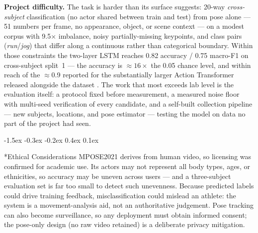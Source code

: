 \documentclass[final]{article}
\makeatletter
\renewcommand{\section}{%
  \@startsection{section}{1}{\z@}%
                {-1.5ex \@plus -0.3ex \@minus -0.2ex}%
                {0.4ex \@plus 0.1ex}%
                {\large\bf\raggedright}%
}
\makeatother
\begin{document}
\textbf{Project difficulty.} The task is harder than its surface suggests: 20-way \emph{cross-subject} classification (no actor shared between train and test) from pose alone --- 51 numbers per frame, no appearance, object, or scene context --- on a modest corpus with 9.5$\times$ imbalance, noisy partially-missing keypoints, and class pairs (\emph{run}/\emph{jog}) that differ along a continuous rather than categorical boundary. Within those constraints the two-layer LSTM reaches 0.82 accuracy / 0.75 macro-F1 on cross-subject split~1 --- the accuracy is $\approx16\times$ the 0.05 chance level, and within reach of the $\approx$0.9 reported for the substantially larger Action Transformer released alongside the dataset \citep{mazzia2021action}. The work that most exceeds lab level is the evaluation itself: a protocol fixed before measurement, a measured noise floor with multi-seed verification of every candidate, and a self-built collection pipeline --- new subjects, locations, and pose estimator --- testing the model on data no part of the project had seen.


\section*{Ethical Considerations}
MPOSE2021 derives from human video, so licensing was confirmed for academic use. Its actors may not represent all body types, ages, or ethnicities, so accuracy may be uneven across users --- and a three-subject evaluation set is far too small to detect such unevenness. Because predicted labels could drive training feedback, misclassification could mislead an athlete: the system is a movement-analysis aid, not an authoritative judgement. Pose tracking can also become surveillance, so any deployment must obtain informed consent; the pose-only design (no raw video retained) is a deliberate privacy mitigation.
\end{document}
